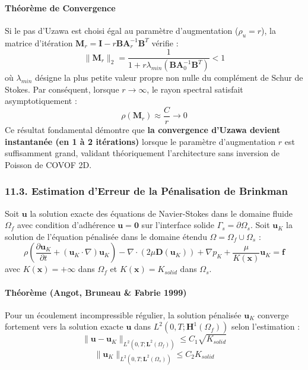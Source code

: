 \documentclass[
  french,
]{article}
\begin{document}
\paragraph{Théorème de Convergence}\label{thuxe9oruxe8me-de-convergence}

Si le pas d'Uzawa est choisi égal au paramètre d'augmentation
(\(\rho_u = r\)), la matrice d'itération
\(\mathbf{M}_r = \mathbf{I} - r \mathbf{B} \mathbf{A}_r^{-1} \mathbf{B}^T\)
vérifie :
\[\|\mathbf{M}_r\|_2 = \frac{1}{1 + r \lambda_{min}(\mathbf{B} \mathbf{A}_0^{-1} \mathbf{B}^T)} < 1\]
où \(\lambda_{min}\) désigne la plus petite valeur propre non nulle du
complément de Schur de Stokes. Par conséquent, lorsque \(r \to \infty\),
le rayon spectral satisfait asymptotiquement :
\[\rho(\mathbf{M}_r) \approx \frac{C}{r} \longrightarrow 0\] Ce résultat
fondamental démontre que \textbf{la convergence d'Uzawa devient
instantanée (en 1 à 2 itérations)} lorsque le paramètre d'augmentation
\(r\) est suffisamment grand, validant théoriquement l'architecture sans
inversion de Poisson de COVOF 2D.

\subsubsection{11.3. Estimation d'Erreur de la Pénalisation de
Brinkman}\label{estimation-derreur-de-la-puxe9nalisation-de-brinkman}

Soit \(\mathbf{u}\) la solution exacte des équations de Navier-Stokes
dans le domaine fluide \(\Omega_f\) avec condition d'adhérence
\(\mathbf{u} = \mathbf{0}\) sur l'interface solide
\(\Gamma_s = \partial \Omega_s\). Soit \(\mathbf{u}_K\) la solution de
l'équation pénalisée dans le domaine étendu
\(\Omega = \Omega_f \cup \Omega_s\) :
\[\rho \left( \frac{\partial \mathbf{u}_K}{\partial t} + (\mathbf{u}_K \cdot \nabla)\mathbf{u}_K \right) - \nabla \cdot (2\mu \mathbf{D}(\mathbf{u}_K)) + \nabla p_K + \frac{\mu}{K(\mathbf{x})} \mathbf{u}_K = \mathbf{f}\]
avec \(K(\mathbf{x}) = +\infty\) dans \(\Omega_f\) et
\(K(\mathbf{x}) = K_{solid}\) dans \(\Omega_s\).

\paragraph{Théorème (Angot, Bruneau \& Fabrie
1999)}\label{thuxe9oruxe8me-angot-bruneau-fabrie-1999}

Pour un écoulement incompressible régulier, la solution pénalisée
\(\mathbf{u}_K\) converge fortement vers la solution exacte
\(\mathbf{u}\) dans \(L^2(0, T; \mathbf{H}^1(\Omega_f))\) selon
l'estimation :
\[\|\mathbf{u} - \mathbf{u}_K\|_{L^2(0, T; \mathbf{L}^2(\Omega_f))} \le C_1 \sqrt{K_{solid}}\]
\[\|\mathbf{u}_K\|_{L^2(0, T; \mathbf{L}^2(\Omega_s))} \le C_2 K_{solid}\]
\end{document}
